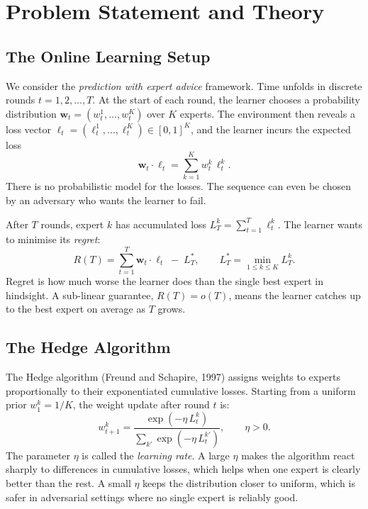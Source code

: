 \documentclass[11pt,a4paper]{article}
\newcommand{\wt}{\boldsymbol{w}_t}
\newcommand{\bsl}{\boldsymbol{\ell}}
\newcommand{\Lstar}{L_T^*}
\begin{document}
\clearpage
\tableofcontents
\clearpage

\section{Problem Statement and Theory}
\label{sec:theory}

\subsection{The Online Learning Setup}

We consider the \emph{prediction with expert advice} framework.  Time unfolds in
discrete rounds $t = 1, 2, \ldots, T$.  At the start of each round, the learner
chooses a probability distribution $\wt = (w_t^1, \ldots, w_t^K)$ over $K$
experts.  The environment then reveals a loss vector
$\bsl_t = (\ell_t^1, \ldots, \ell_t^K) \in [0,1]^K$, and the
learner incurs the expected loss
\[
  \wt \cdot \bsl_t = \sum_{k=1}^{K} w_t^k \, \ell_t^k.
\]
There is no probabilistic model for the losses. The sequence can even be
chosen by an adversary who wants the learner to fail.

After $T$ rounds, expert $k$ has accumulated loss $L_T^k = \sum_{t=1}^T \ell_t^k$.
The learner wants to minimise its \emph{regret}:
\begin{equation}
  \label{eq:regret}
  R(T) = \sum_{t=1}^T \wt \cdot \bsl_t \;-\; \Lstar,
  \qquad \Lstar = \min_{1 \le k \le K} L_T^k.
\end{equation}
Regret is how much worse the learner does than the single best expert in
hindsight. A sub-linear guarantee, $R(T) = o(T)$, means the learner catches
up to the best expert on average as $T$ grows.

\subsection{The Hedge Algorithm}

The Hedge algorithm (Freund and Schapire, 1997) assigns weights to experts
proportionally to their exponentiated cumulative losses.  Starting from a uniform
prior $w_1^k = 1/K$, the weight update after round $t$ is:
\begin{equation}
  \label{eq:hedge_update}
  w_{t+1}^k = \frac{\exp(-\eta \, L_t^k)}{\sum_{k'} \exp(-\eta \, L_t^{k'})},
  \qquad \eta > 0.
\end{equation}
The parameter $\eta$ is called the \emph{learning rate}.  A large $\eta$ makes
the algorithm react sharply to differences in cumulative losses, which helps when
one expert is clearly better than the rest.  A small $\eta$ keeps the distribution
closer to uniform, which is safer in adversarial settings where no single expert
is reliably good.
\end{document}
